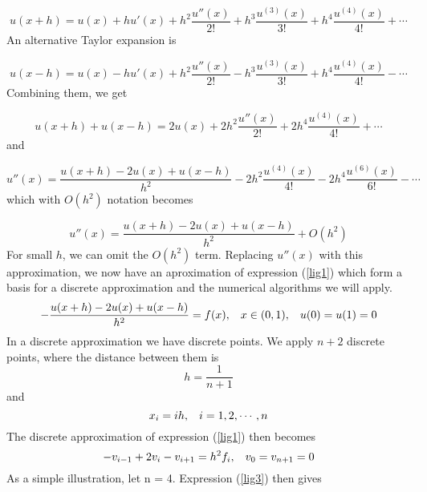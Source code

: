 \documentclass[11pt]{article}
\begin{document}
\begin{equation*}
u(x + h) = u(x) + hu'(x) + h^2\frac{u''(x)}{2!} + h^3\frac{u^{(3)}(x)}{3!} 
+ h^4\frac{u^{(4)}(x)}{4!} + \cdots
\end{equation*}
An alternative Taylor expansion is

\begin{equation*}
u(x - h) = u(x) - hu'(x) + h^2\frac{u''(x)}{2!} - h^3\frac{u^{(3)}(x)}{3!} 
+ h^4\frac{u^{(4)}(x)}{4!} - \cdots
\end{equation*}
Combining them, we get

\begin{equation*}
u(x+h) +u(x-h) = 2u(x) + 2h^2\frac{u''(x)}{2!} +2h^4\frac{u^{(4)}(x)}{4!} + \cdots
\end{equation*}
and

\begin{equation*}
u''(x) = \frac{u(x+h)-2u(x)+u(x-h)}{h^2}-2h^2\frac{u^{(4)}(x)}{4!}-2h^4\frac{u^{(6)}(x)}{6!}
- \cdots 
\end{equation*}
which with $O(h^2)$ notation becomes

\begin{equation*}
u''(x) = \frac{u(x+h)-2u(x)+u(x-h)}{h^2} + O(h^2)
\end{equation*}
For small $h$, we can omit the $O(h^2)$ term. Replacing $u''(x)$ with this approximation, we 
now have an aproximation of expression (\ref{lig1}) which form a basis for a discrete 
approximation and the numerical algorithms we will apply.
\begin{equation}
-\frac{u(x+h)-2u(x)+u(x-h)}{h^2} = f(x), \hspace{0.3cm} x\in(0,1), \hspace{0.3cm} u(0) = u(1) = 0
\label{lig2}
\end{equation}
In a discrete approximation we have discrete points. We apply $n+2$ discrete points, where the
distance between them is
\begin{equation*}
h = \frac{1}{n+1}
\end{equation*}
and 
\begin{equation*}
x_i = ih,  \hspace{0.3cm} i = 1, 2, \cdots, n
\end{equation*}
The discrete approximation of expression (\ref{lig1}) then becomes 
\begin{equation}
-v_{i-1}+2v_i-v_{i+1} = h^2f_i, \hspace{0.3cm} v_0 = v_{n+1} = 0
\label{lig3}
\end{equation}
As a simple illustration, let n = 4. Expression (\ref{lig3}) then gives
\end{document}
